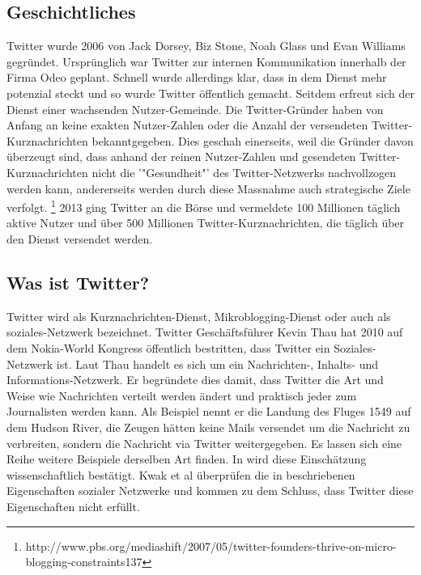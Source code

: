 	\subsection{Geschichtliches}
	Twitter wurde 2006 von Jack Dorsey, Biz Stone, Noah Glass und Evan Williams gegründet.
	Ursprünglich war Twitter zur internen Kommunikation innerhalb der Firma Odeo geplant.
	Schnell wurde allerdings klar, dass in dem Dienst mehr potenzial steckt und so wurde Twitter öffentlich gemacht.
	Seitdem erfreut sich der Dienst einer wachsenden Nutzer-Gemeinde.
	Die Twitter-Gründer haben von Anfang an keine exakten Nutzer-Zahlen oder die Anzahl der versendeten Twitter-Kurznachrichten bekanntgegeben.
	Dies geschah einerseits, weil die Gründer davon überzeugt sind, dass anhand der reinen Nutzer-Zahlen und gesendeten Twitter-Kurznachrichten nicht die '"Gesundheit"' des Twitter-Netzwerks nachvollzogen werden kann, andererseits werden durch diese Massnahme auch strategische Ziele verfolgt.  \footnote{http://www.pbs.org/mediashift/2007/05/twitter-founders-thrive-on-micro-blogging-constraints137}
	2013 ging Twitter an die Börse und vermeldete 100 Millionen täglich aktive Nutzer und über 500 Millionen Twitter-Kurznachrichten, die täglich über den Dienst versendet werden. 

	\subsection{Was ist Twitter?}
	Twitter wird als Kurznachrichten-Dienst, Mikroblogging-Dienst oder auch als soziales-Netzwerk bezeichnet. 
	Twitter Geschäftsführer Kevin Thau hat 2010 auf dem Nokia-World Kongress öffentlich bestritten, dass Twitter ein Soziales-Netzwerk ist. 
	Laut Thau handelt es sich um ein Nachrichten-, Inhalts- und Informations-Netzwerk. 
	Er begründete dies damit, dass Twitter die Art und Weise wie Nachrichten verteilt werden ändert und praktisch jeder zum Journalisten werden kann. 
	Als Beispiel nennt er die Landung des Fluges 1549 auf dem Hudson River, die Zeugen hätten keine Mails versendet um die Nachricht zu verbreiten, sondern die Nachricht via Twitter weitergegeben.
	Es lassen sich eine Reihe weitere Beispiele derselben Art finden. 
	In \cite{Kwak2010} wird diese Einschätzung wissenschaftlich bestätigt.
	Kwak et al überprüfen die in \cite{Newman2003} beschriebenen Eigenschaften sozialer Netzwerke und kommen zu dem Schluss, dass Twitter diese Eigenschaften nicht erfüllt.


